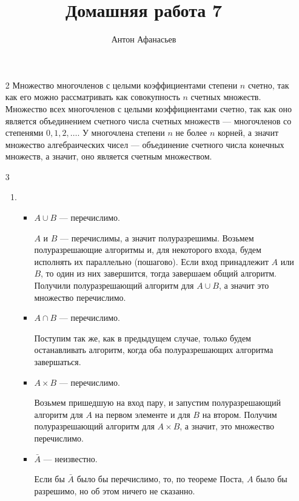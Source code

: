 \documentclass[10pt]{article}
\begin{document}
\title{Домашняя работа 7}
\author{Антон Афанасьев}
\maketitle

\begin{enumerate}

\item[2] Множество многочленов с целыми коэффициентами степени $n$ счетно, так как его можно рассматривать как совокупность $n$ счетных множеств. Множество всех многочленов с целыми коэффициентами счетно, так как оно является объединением счетного числа счетных множеств --- многочленов со степенями $0, 1, 2, \ldots$. У многочлена степени $n$ не более $n$ корней, а значит множество алгебраических чисел --- объединение счетного числа конечных множеств, а значит, оно является счетным множеством.

\item[3] 
\begin{enumerate}
	\item 
	\begin{itemize}
	
	\item $A \cup B$ --- перечислимо.
	
	 $A$ и $B$ --- перечислимы, а значит полуразрешимы. Возьмем полуразрешающие алгоритмы и, для некоторого входа, будем исполнять их параллельно (пошагово). Если вход принадлежит $A$ или $B$, то один из них завершится, тогда завершаем общий алгоритм. Получили полуразрешающий алгоритм для $A \cup B$, а значит это множество перечислимо.
	
	\item $A \cap B$ --- перечислимо.
	
	 Поступим так же, как в предыдущем случае, только будем останавливать алгоритм, когда оба полуразрешающих алгоритма завершаться.
	 
	\item $A \times B$ --- перечислимо.
	
	Возьмем пришедшую на вход пару, и запустим полуразрешающий алгоритм для $A$ на первом элементе и для $B$ на втором. Получим полуразрешающий алгоритм для $A \times B$, а значит, это множество перечислимо.
	
	\item $\bar A$ --- неизвестно.
	
	Если бы $\bar A$ было бы перечислимо, то, по теореме Поста, $A$ было бы разрешимо, но об этом ничего не сказанно.
	

\end{itemize}
\end{enumerate}
\end{enumerate}
\end{document}

